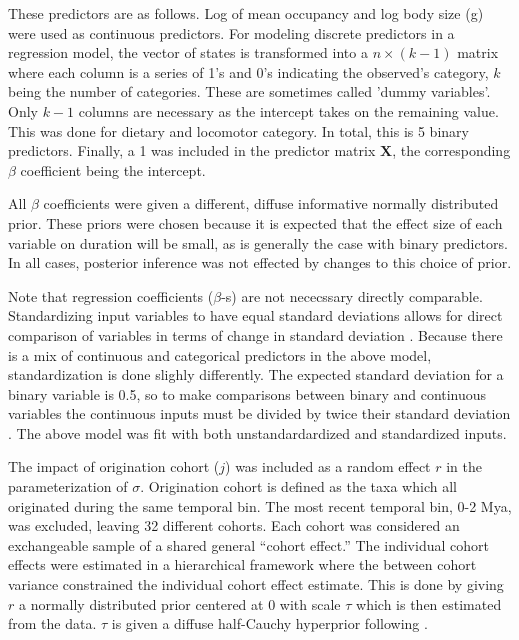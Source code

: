 \documentclass[12pt,letterpaper]{article}
\begin{document}
These predictors are as follows. Log of mean occupancy and log body size (g) were used as continuous predictors. For modeling discrete predictors in a regression model, the vector of states is transformed into a \(n \times (k - 1)\) matrix where each column is a series of 1's and 0's indicating the observed's category, \(k\) being the number of categories. These are sometimes called 'dummy variables'. Only \(k - 1\) columns are necessary as the intercept takes on the remaining value. This was done for dietary and locomotor category. In total, this is 5 binary predictors. Finally, a 1 was included in the predictor matrix \(\mathbf{X}\), the corresponding \(\beta\) coefficient being the intercept.

All \(\beta\) coefficients were given a different, diffuse informative normally distributed prior. These priors were chosen because it is expected that the effect size of each variable on duration will be small, as is generally the case with binary predictors. In all cases, posterior inference was not effected by changes to this choice of prior.

Note that regression coefficients (\(\beta\)-s) are not nececssary directly comparable. Standardizing input variables to have equal standard deviations allows for direct comparison of variables in terms of change in standard deviation \citep{Schielzeth2010}. Because there is a mix of continuous and categorical predictors in the above model, standardization is done slighly differently. The expected standard deviation for a binary variable is 0.5, so to make comparisons between binary and continuous variables the continuous inputs must be divided by twice their standard deviation \citep{Gelman2008}. The above model was fit with both unstandardardized and standardized inputs.

The impact of origination cohort (\(j\)) was included as a random effect \(r\) in the parameterization of \(\sigma\). Origination cohort is defined as the taxa which all originated during the same temporal bin. The most recent temporal bin, 0-2 Mya, was excluded, leaving 32 different cohorts. Each cohort was considered an exchangeable sample of a shared general ``cohort effect.'' The individual cohort effects were estimated in a hierarchical framework where the between cohort variance constrained the individual cohort effect estimate. This is done by giving \(r\) a normally distributed prior centered at 0 with scale \(\tau\) which is then estimated from the data. \(\tau\) is given a diffuse half-Cauchy hyperprior following \citet{Gelman2006a}.
\end{document}
